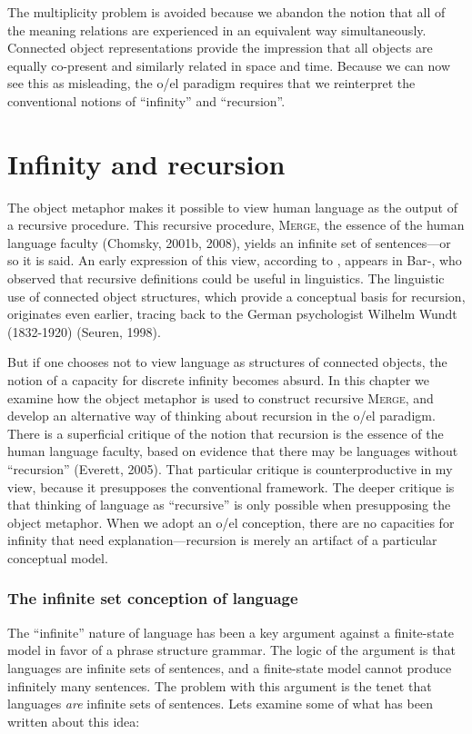   The multiplicity problem is avoided because we abandon the notion that all of the meaning relations are experienced in an equivalent way simultaneously. Connected object representations provide the impression that all objects are equally co-present and similarly related in space and time. Because we can now see this as misleading, the o/el paradigm requires that we reinterpret the conventional notions of “infinity” and “recursion”.

\chapter{Infinity and recursion}

The object metaphor makes it possible to view human language as the output of a recursive procedure. This recursive procedure, \textsc{Merge}, the essence of the human language faculty (Chomsky, 2001b, 2008), yields an infinite set of sentences—or so it is said. An early expression of this view, according to \citet{Tomalin2007}, appears in Bar-\citet{Hillel1953}, who observed that recursive definitions could be useful in linguistics. The linguistic use of connected object structures, which provide a conceptual basis for recursion, originates even earlier, tracing back to the German psychologist Wilhelm Wundt (1832-1920) (Seuren, 1998).

  But if one chooses not to view language as structures of connected objects, the notion of a capacity for discrete infinity becomes absurd. In this chapter we examine how the object metaphor is used to construct recursive \textsc{Merge}, and develop an alternative way of thinking about recursion in the o/el paradigm. There is a superficial critique of the notion that recursion is the essence of the human language faculty, based on evidence that there may be languages without “recursion” (Everett, 2005). That particular critique is counterproductive in my view, because it presupposes the conventional framework. The deeper critique is that thinking of language as “recursive” is only possible when presupposing the object metaphor. When we adopt an o/el conception, there are no capacities for infinity that need explanation—recursion is merely an artifact of a particular conceptual model.

\subsection{The infinite set conception of language}

The “infinite” nature of language has been a key argument against a finite-state model in favor of a phrase structure grammar. The logic of the argument is that languages are infinite sets of sentences, and a finite-state model cannot produce infinitely many sentences. The problem with this argument is the tenet that languages \textit{are} infinite sets of sentences. Lets examine some of what has been written about this idea:  

